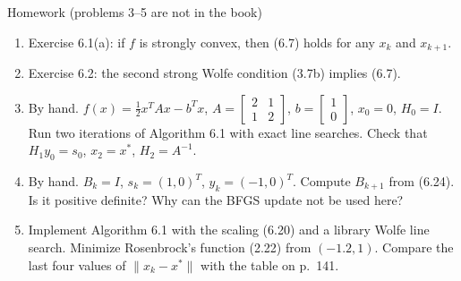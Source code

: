 \documentclass[aspectratio=169,12pt]{beamer}
\newcommand{\xs}{x^{*}}
\begin{document}
\begin{frame}{Homework {\normalfont\small(problems 3--5 are not in the book)}}
  \begin{enumerate}\setlength\itemsep{0.5em}
    \item Exercise 6.1(a): if $f$ is strongly convex, then (6.7) holds for any $x_{k}$ and $x_{k+1}$.
    \item Exercise 6.2: the second strong Wolfe condition (3.7b) implies (6.7).
    \item By hand. $f(x)=\tfrac12x^{T}Ax-b^{T}x$,
      $A=\begin{bmatrix}2&1\\1&2\end{bmatrix}$, $b=\begin{bmatrix}1\\0\end{bmatrix}$, $x_{0}=0$,
      $H_{0}=I$. Run two iterations of Algorithm 6.1 with exact line searches.
      Check that $H_{1}y_{0}=s_{0}$, $x_{2}=\xs$, $H_{2}=A^{-1}$.
    \item By hand. $B_{k}=I$, $s_{k}=(1,0)^{T}$, $y_{k}=(-1,0)^{T}$. Compute $B_{k+1}$ from (6.24).
      Is it positive definite? Why can the BFGS update not be used here?
    \item Implement Algorithm 6.1 with the scaling (6.20) and a library Wolfe line search.
      Minimize Rosenbrock's function (2.22) from $(-1.2,1)$. Compare the last four values
      of $\|x_{k}-\xs\|$ with the table on p.~141.
  \end{enumerate}
\end{frame}
\end{document}

